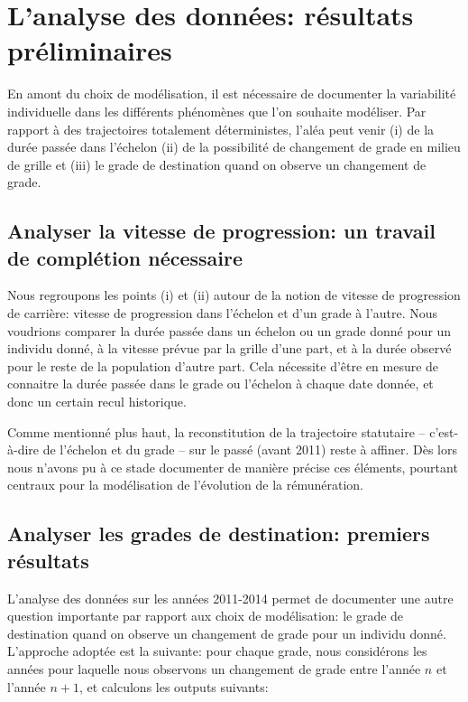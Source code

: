 \documentclass[11pt,a4paper]{article}
\begin{document}
\else \fi



\section{L'analyse des données: résultats préliminaires}

En amont du choix de modélisation, il est nécessaire de documenter la variabilité individuelle dans les différents phénomènes que l'on souhaite modéliser. Par rapport à des trajectoires totalement déterministes, l'aléa peut venir (i) de la durée passée dans l'échelon (ii) de la possibilité de changement de grade en milieu de grille et (iii) le grade de destination quand on observe un changement de grade. 

\subsection{Analyser la vitesse de progression: un travail de complétion nécessaire}

Nous regroupons les points (i) et (ii) autour de la notion de vitesse de progression de carrière: vitesse de progression dans l'échelon et d'un grade à l'autre. Nous voudrions comparer la durée passée dans un échelon ou un grade donné pour un individu donné, à la vitesse prévue par la grille d'une part, et à la durée observé pour le reste de la population d'autre part. Cela nécessite d'être en mesure de connaitre la durée passée dans le grade ou l'échelon à chaque date donnée, et donc un certain recul historique. 

Comme mentionné plus haut, la reconstitution de la trajectoire statutaire -- c'est-à-dire de l'échelon et du grade -- sur le passé (avant 2011) reste à affiner. Dès lors nous n'avons pu à ce stade documenter de manière précise ces éléments, pourtant centraux pour la modélisation de l'évolution de la rémunération. 


\subsection{Analyser les grades de destination: premiers résultats}

L'analyse des données sur les années 2011-2014 permet de documenter une autre question importante par rapport aux choix de modélisation: le grade de destination quand on observe un changement de grade pour un individu donné. L'approche adoptée est la suivante: pour chaque grade, nous considérons les années pour laquelle nous observons un changement de grade entre l'année $n$ et l'année $n+1$, et calculons les outputs suivants: 
\end{document}
